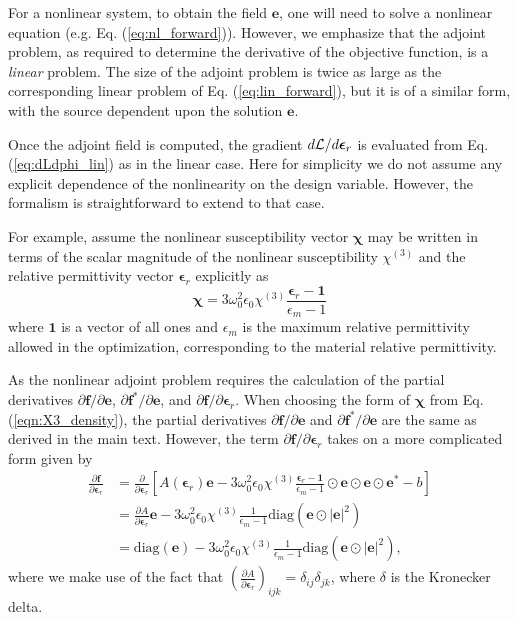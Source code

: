 For a nonlinear system, to obtain the field $\mathbf{e}$, one will need to solve a nonlinear equation (e.g. Eq. (\ref{eq:nl_forward})). However, we emphasize that the adjoint problem, as required to determine the derivative of the objective function, is a \textit{linear} problem. The size of the adjoint problem is twice as large as the corresponding linear problem of Eq. (\ref{eq:lin_forward}), but it is of a similar form, with the source dependent upon the solution $\mathbf{e}$.   

Once the adjoint field is computed, the gradient $d\mathcal{L}/d\bm{\epsilon}_r$ is evaluated from Eq. (\ref{eq:dLdphi_lin}) as in the linear case.  Here for simplicity we do not assume any explicit dependence of the nonlinearity on the design variable. However, the formalism is straightforward to extend to that case.

For example, assume the nonlinear susceptibility vector $\bm{\chi}$ may be written in terms of the scalar magnitude of the nonlinear susceptibility $\chi^{(3)}$ and the relative permittivity vector $\bm{\epsilon}_r$ explicitly as
%
\begin{equation}
\bm{\chi} = 3\omega_0^2\epsilon_0 \chi^{(3)}\frac{\bm{\epsilon}_r - \mathbf{1}}{\epsilon_m - 1}
\label{eqn:X3_density}
\end{equation}
%
where $\mathbf{1}$ is a vector of all ones and $\epsilon_m$ is the maximum relative permittivity allowed in the optimization, corresponding to the material relative permittivity.

As the nonlinear adjoint problem requires the calculation of the partial derivatives $\partial \mathbf{f} / \partial \mathbf{e}$, $\partial \mathbf{f}^* / \partial \mathbf{e}$, and $\partial \mathbf{f} / \partial \bm{\epsilon}_r$.  When choosing the form of $\bm{\chi}$ from Eq. (\ref{eqn:X3_density}), the partial derivatives $\partial \mathbf{f} / \partial \mathbf{e}$ and $\partial \mathbf{f}^* / \partial \mathbf{e}$ are the same as derived in the main text.  However, the term $\partial \mathbf{f} / \partial \bm{\epsilon}_r$ takes on a more complicated form given by
%
\begin{align}
\frac{\partial \mathbf{f}}{\partial \bm{\epsilon}_r} &= \frac{\partial}{\partial \bm{\epsilon}_r} \left[ A(\bm{\epsilon}_r)\mathbf{e} - 3\omega_0^2\epsilon_0 \chi^{(3)}\frac{\bm{\epsilon}_r - \mathbf{1}}{\epsilon_m - 1} \odot \mathbf{e} \odot \mathbf{e} \odot \mathbf{e}^* - b \right] \\ 
&= \frac{\partial A}{\partial \bm{\epsilon}_r}\mathbf{e}  - 3\omega_0^2\epsilon_0 \chi^{(3)}\frac{1}{\epsilon_m - 1} \textrm{diag}\left( \mathbf{e} \odot |\mathbf{e}|^2 \right) \\
&= \textrm{diag}\left( \mathbf{e} \right)  - 3\omega_0^2\epsilon_0 \chi^{(3)}\frac{1}{\epsilon_m - 1} \textrm{diag}\left( \mathbf{e} \odot |\mathbf{e}|^2 \right),
\label{eqn:prop_dfdp}
\end{align}
where we make use of the fact that $\left(\frac{\partial A}{\partial \bm{\epsilon}_r}\right)_{ijk} = \delta_{ij}\delta_{jk}$, where $\delta$ is the Kronecker delta.

